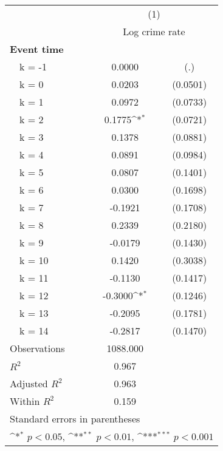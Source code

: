 {
\def\sym#1{\ifmmode^{#1}\else\(^{#1}\)\fi}
\begin{tabular}{l*{1}{cc}}
\toprule
                &\multicolumn{2}{c}{(1)}     \\
                &\multicolumn{2}{c}{Log crime rate}\\
\midrule
\textbf{Event time}&                  &         \\
~~k = -1        &   0.0000         &      (.)\\
~~k = 0         &   0.0203         & (0.0501)\\
~~k = 1         &   0.0972         & (0.0733)\\
~~k = 2         &   0.1775\sym{*}  & (0.0721)\\
~~k = 3         &   0.1378         & (0.0881)\\
~~k = 4         &   0.0891         & (0.0984)\\
~~k = 5         &   0.0807         & (0.1401)\\
~~k = 6         &   0.0300         & (0.1698)\\
~~k = 7         &  -0.1921         & (0.1708)\\
~~k = 8         &   0.2339         & (0.2180)\\
~~k = 9         &  -0.0179         & (0.1430)\\
~~k = 10        &   0.1420         & (0.3038)\\
~~k = 11        &  -0.1130         & (0.1417)\\
~~k = 12        &  -0.3000\sym{*}  & (0.1246)\\
~~k = 13        &  -0.2095         & (0.1781)\\
~~k = 14        &  -0.2817         & (0.1470)\\
\midrule
Observations    & 1088.000         &         \\
\(R^{2}\)       &    0.967         &         \\
Adjusted \(R^{2}\)&    0.963         &         \\
Within \(R^{2}\)&    0.159         &         \\
\bottomrule
\multicolumn{3}{l}{\footnotesize Standard errors in parentheses}\\
\multicolumn{3}{l}{\footnotesize \sym{*} \(p<0.05\), \sym{**} \(p<0.01\), \sym{***} \(p<0.001\)}\\
\end{tabular}
}
